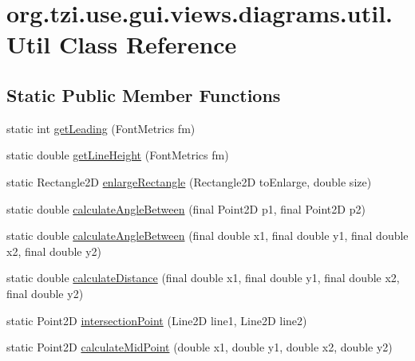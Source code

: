 \hypertarget{classorg_1_1tzi_1_1use_1_1gui_1_1views_1_1diagrams_1_1util_1_1_util}{\section{org.\-tzi.\-use.\-gui.\-views.\-diagrams.\-util.\-Util Class Reference}
\label{classorg_1_1tzi_1_1use_1_1gui_1_1views_1_1diagrams_1_1util_1_1_util}
}
\subsection*{Static Public Member Functions}
\begin{DoxyCompactItemize}
\item 
static int \hyperlink{classorg_1_1tzi_1_1use_1_1gui_1_1views_1_1diagrams_1_1util_1_1_util_a9d44cba6533f5e268420e8e0061dcb75}{get\-Leading} (Font\-Metrics fm)
\item 
static double \hyperlink{classorg_1_1tzi_1_1use_1_1gui_1_1views_1_1diagrams_1_1util_1_1_util_a7df2c6af2892e67c7319e61f963d9183}{get\-Line\-Height} (Font\-Metrics fm)
\item 
static Rectangle2\-D \hyperlink{classorg_1_1tzi_1_1use_1_1gui_1_1views_1_1diagrams_1_1util_1_1_util_a60c8ad9798218d3df6b6c003a71ce9a7}{enlarge\-Rectangle} (Rectangle2\-D to\-Enlarge, double size)
\item 
static double \hyperlink{classorg_1_1tzi_1_1use_1_1gui_1_1views_1_1diagrams_1_1util_1_1_util_a7b04e74f931cfefab1d0fc9a758a30a5}{calculate\-Angle\-Between} (final Point2\-D p1, final Point2\-D p2)
\item 
static double \hyperlink{classorg_1_1tzi_1_1use_1_1gui_1_1views_1_1diagrams_1_1util_1_1_util_a9fee38d59397fe9e298ad89c61599c4e}{calculate\-Angle\-Between} (final double x1, final double y1, final double x2, final double y2)
\item 
static double \hyperlink{classorg_1_1tzi_1_1use_1_1gui_1_1views_1_1diagrams_1_1util_1_1_util_a8f7ea375f97ba1f651586c0570ffae59}{calculate\-Distance} (final double x1, final double y1, final double x2, final double y2)
\item 
static Point2\-D \hyperlink{classorg_1_1tzi_1_1use_1_1gui_1_1views_1_1diagrams_1_1util_1_1_util_a033d17acf7cf1bafe7a955bbeada24dc}{intersection\-Point} (Line2\-D line1, Line2\-D line2)
\item 
static Point2\-D \hyperlink{classorg_1_1tzi_1_1use_1_1gui_1_1views_1_1diagrams_1_1util_1_1_util_a579179864ff21133e111fa599f16c575}{calculate\-Mid\-Point} (double x1, double y1, double x2, double y2)

\end{DoxyCompactItemize}
